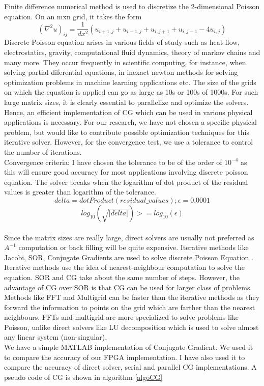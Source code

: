 \documentclass{article}
\begin{document}
\begin{spacing}{1.1}
    Finite difference numerical method is used to discretize the 2-dimensional Poisson equation. On an m{x}n grid, it takes the form
\[(\nabla^2	u)_{ij} = \dfrac{1}{dx^2}(u_{i+1,j} + u_{i-1,j} + u_{i,j+1} + u_{i,j-1} - 4u_{i,j} ) \] 
	Discrete Poisson equation arises in various fields of study such as heat flow, electrostatics, gravity, computational fluid dynamics, theory of markov chains and many more. They occur frequently in scientific computing, for instance, when solving partial diferential equations, in inexact newton methods for solving optimization problems in machine learning applications etc. The size of the grids on which the equation is applied can go as large as 10s or 100s of 1000s. For such large matrix sizes, it is clearly essential to parallelize and optimize the solvers. Hence, an efficient implementation of CG which can be used in various physical applications is necessary. For our research, we have not chosen a specific physical problem, but would like to contribute possible optimization techniques for this iterative solver. However, for the convergence test, we use a tolerance to control the number of iterations. \\
	Convergence criteria: I have chosen the tolerance to be of the order of $10^{-4}$ as this will ensure good accuracy for most applications involving discrete poisson equation. 
	The solver breaks when the logarithm of dot product of the residual values is greater than logarithm of the tolerance.
\[ delta = dotProduct(residual\_values); \epsilon = 0.0001 \]
\[ log_{10}(\sqrt{|delta|}) >= log_{10}(\epsilon) \] 
\\
	Since the matrix sizes are really large, direct solvers are usually not preferred as $A^{-1}$ computation or back filling will be quite expensive. Iterative methods like  Jacobi, SOR, Conjugate Gradients are used to solve discrete Poisson Equation \cite{Berkley1996}. Iterative methods use the idea of nearest-neighbour computation to solve the equation. SOR and CG take about the same number of steps. However, the advantage of CG over SOR is that CG can be used for larger class of problems. Methods like FFT and Multigrid can be faster than the iterative methods as they forward the information to points on the grid which are farther than the nearest neighbours. FFTs and multigrid are more specialized to solve problems like Poisson, unlike direct solvers like LU decomposition which is used to solve almost any linear system (non-singular). \cite{FFTPoisson}
	\\
	We have a simple MATLAB implementation of Conjugate Gradient. We used it to compare the accuracy of our FPGA implementation. I have also used it to compare the accuracy of direct solver, serial and parallel CG implementations. A pseudo code of CG is shown in algorithm \ref{algoCG}
	

\end{spacing}
\end{document}
